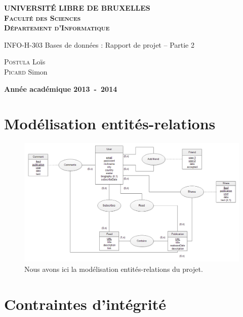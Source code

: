\documentclass[a4paper,10pt]{article}
\begin{document}
\begin{titlepage}
	\begin{center}
	\textbf{\textsc{UNIVERSIT\'E LIBRE DE BRUXELLES}}\\
	\textbf{\textsc{Faculté des Sciences}}\\
	\textbf{\textsc{Département d'Informatique}}
	\vfill{}\vfill{}
	\begin{center}{\Huge INFO-H-303 Bases de données : Rapport de projet -- Partie 2}\end{center}{\Huge \par}
	\begin{center}{\large \textsc{Postula} Loïs \\ \textsc{Picard} Simon}\end{center}{\Huge \par}
	\vfill{}\vfill{}
	\vfill{}\vfill{}\enlargethispage{3cm}
	\textbf{Année académique 2013~-~2014}
	\end{center}
	\end{titlepage}
	
    \pagebreak
	\tableofcontents
	\clearpage

    \section{Modélisation entités-relations}
	
	\begin{figure}[ht]
	\includegraphics[width = \textwidth]{dea.png}
	\caption{Nous avons ici la modélisation entités-relations du projet.}
	\end{figure}

    \section{Contraintes d'intégrité}
    
\end{document}
